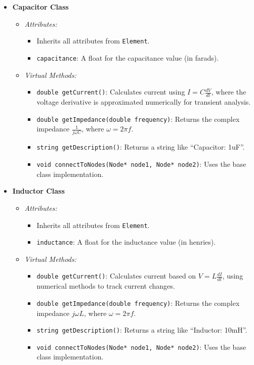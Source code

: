 \documentclass{article}
\begin{document}
\begin{enumerate}
\begin{itemize}
        \item \textbf{Capacitor Class}
        \begin{itemize}
            \item \textit{Attributes:}
            \begin{itemize}
                \item Inherits all attributes from \texttt{Element}.
                \item \texttt{capacitance}: A float for the capacitance value (in farads).
            \end{itemize}
            \item \textit{Virtual Methods:}
            \begin{itemize}
                \item \texttt{double getCurrent()}: Calculates current using \( I = C \frac{dV}{dt} \), where the voltage derivative is approximated numerically for transient analysis.
                \item \texttt{double getImpedance(double frequency)}: Returns the complex impedance \( \frac{1}{j \omega C} \), where \( \omega = 2\pi f \).
                \item \texttt{string getDescription()}: Returns a string like “Capacitor: 1uF”.
                \item \texttt{void connectToNodes(Node* node1, Node* node2)}: Uses the base class implementation.
            \end{itemize}
        \end{itemize}

        \item \textbf{Inductor Class}
        \begin{itemize}
            \item \textit{Attributes:}
            \begin{itemize}
                \item Inherits all attributes from \texttt{Element}.
                \item \texttt{inductance}: A float for the inductance value (in henries).
            \end{itemize}
            \item \textit{Virtual Methods:}
            \begin{itemize}
                \item \texttt{double getCurrent()}: Calculates current based on \( V = L \frac{dI}{dt} \), using numerical methods to track current changes.
                \item \texttt{double getImpedance(double frequency)}: Returns the complex impedance \( j \omega L \), where \( \omega = 2\pi f \).
                \item \texttt{string getDescription()}: Returns a string like “Inductor: 10mH”.
                \item \texttt{void connectToNodes(Node* node1, Node* node2)}: Uses the base class implementation.
            \end{itemize}
        \end{itemize}


\end{itemize}
\end{enumerate}
\end{document}
